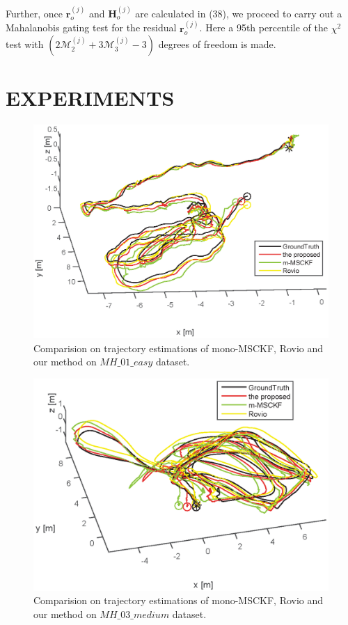 \documentclass[a4paper, 10pt, conference]{ieeeconf}      %
\begin{document}
Further, once $\bm r_o^{(j)} $ and $\bm H_o^{(j)}$ are calculated in (38), we proceed to carry out a
Mahalanobis gating test for the residual $\bm r_o^{(j)}$.   Here a  95th percentile of the $ \chi^2 $ test with  $ (2 \mathcal  M_2^{(j)} + 3 \mathcal  M_3^{(j)} -3)  $ degrees of freedom is made.



\section{EXPERIMENTS}



\begin{figure}[thpb]
	\centering
	
	\includegraphics[scale=0.6]{MH01_3compare_legend.eps}
	
	\caption{Comparision on trajectory estimations of  mono-MSCKF, Rovio and our method on $MH\_01\_easy$ dataset. }
	\label{figurelabel}
\end{figure}
\begin{figure}[thpb]
	\centering
	
	\includegraphics[scale=0.6]{MH03_3compare_legend.eps}
	
	\caption{Comparision on trajectory estimations of  mono-MSCKF, Rovio and our method on $MH\_03\_medium$ dataset. }
	\label{figurelabel}
\end{figure}
\end{document}
